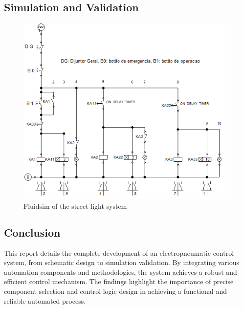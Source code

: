 \subsection{Simulation and Validation} \label{sec:Simulation_and_Validation}

\begin{figure}[H]
    \includegraphics[width=16cm]{Images/Q5/fluidsim.png}
    \centering
    \caption{Fluidsim of the street light system}
    \label{fig:fluidsim}
\end{figure}

\subsection{Conclusion}

This report details the complete development of an electropneumatic control system, from schematic 
design to simulation validation. By integrating various automation components and methodologies, 
the system achieves a robust and efficient control mechanism. The findings highlight the importance 
of precise component selection and control logic design in achieving a functional and reliable 
automated process.